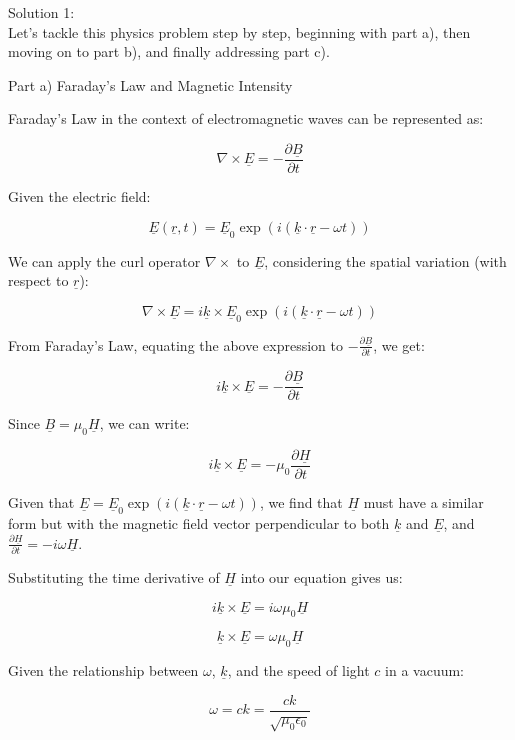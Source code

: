 \documentclass[a4paper,11pt]{article}
\begin{document}
\bigskip

\noindent Solution 1: \\
Let's tackle this physics problem step by step, beginning with part a), then moving on to part b), and finally addressing part c).

Part a) Faraday’s Law and Magnetic Intensity

Faraday's Law in the context of electromagnetic waves can be represented as:

\[
\nabla \times \underline{E} = -\frac{\partial \underline{B}}{\partial t}
\]

Given the electric field:

\[
\underline{E}(\underline{r}, t) = \underline{E}_{0} \exp (i(\underline{k} \cdot \underline{r} - \omega t))
\]

We can apply the curl operator \(\nabla \times\) to \(\underline{E}\), considering the spatial variation (with respect to \(\underline{r}\)):

\[
\nabla \times \underline{E} = i\underline{k} \times \underline{E}_{0} \exp (i(\underline{k} \cdot \underline{r} - \omega t))
\]

From Faraday's Law, equating the above expression to \(-\frac{\partial \underline{B}}{\partial t}\), we get:

\[
i\underline{k} \times \underline{E} = -\frac{\partial \underline{B}}{\partial t}
\]

Since \(\underline{B} = \mu_{0} \underline{H}\), we can write:

\[
i\underline{k} \times \underline{E} = -\mu_{0} \frac{\partial \underline{H}}{\partial t}
\]

Given that \(\underline{E} = \underline{E}_{0} \exp (i(\underline{k} \cdot \underline{r} - \omega t))\), we find that \(\underline{H}\) must have a similar form but with the magnetic field vector perpendicular to both \(\underline{k}\) and \(\underline{E}\), and \(\frac{\partial \underline{H}}{\partial t} = -i\omega \underline{H}\).

Substituting the time derivative of \(\underline{H}\) into our equation gives us:

\[
i\underline{k} \times \underline{E} = i\omega\mu_{0} \underline{H}
\]

\[
\underline{k} \times \underline{E} = \omega\mu_{0} \underline{H}
\]

Given the relationship between \(\omega\), \(\underline{k}\), and the speed of light \(c\) in a vacuum:

\[
\omega = ck = \frac{ck}{\sqrt{\mu_{0}\epsilon_{0}}}
\]
\end{document}
